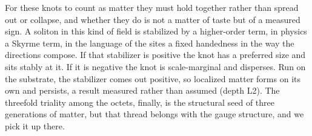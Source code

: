 For these knots to count as matter they must hold together rather than spread out or collapse, and whether they do is not a matter of taste but of a measured sign. A soliton in this kind of field is stabilized by a higher-order term, in physics a Skyrme term, in the language of the sites a fixed handedness in the way the directions compose. If that stabilizer is positive the knot has a preferred size and sits stably at it. If it is negative the knot is scale-marginal and disperses. Run on the substrate, the stabilizer comes out positive, so localized matter forms on its own and persists, a result measured rather than assumed (depth L2). The threefold triality among the octets, finally, is the structural seed of three generations of matter, but that thread belongs with the gauge structure, and we pick it up there.

